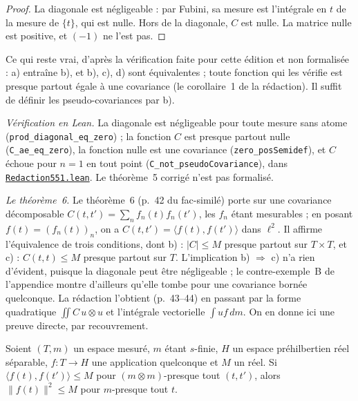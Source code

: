 \begin{proof}
La diagonale est négligeable : par Fubini, sa mesure est l'intégrale en $t$ de la mesure de $\{t\}$, qui est nulle. Hors de la diagonale, $C$ est nulle. La matrice nulle est positive, et $(-1)$ ne l'est pas.
\end{proof}

\noindent Ce qui reste vrai, d'après la vérification faite pour cette édition et non formalisée : a) entraîne b), et b), c), d) sont équivalentes ; toute fonction qui les vérifie est presque partout égale à une covariance (le corollaire~1 de la rédaction). Il suffit de définir les pseudo-covariances par b).

\begin{sloppypar}
\noindent\emph{Vérification en Lean.} La diagonale est négligeable pour toute mesure sans atome (\texttt{prod\_diagonal\_eq\_zero}) ; la fonction $C$ est presque partout nulle (\texttt{C\_ae\_eq\_zero}), la fonction nulle est une covariance (\texttt{zero\_posSemidef}), et $C$ échoue pour $n = 1$ en tout point (\texttt{C\_not\_pseudoCovariance}), dans \href{\leanblobmain/Redaction551.lean}{\texttt{Redaction551.\allowbreak{}lean}}. Le théorème~5 corrigé n'est pas formalisé.
\end{sloppypar}

\emph{Le théorème~6.} Le théorème~6 (p.~42 du fac-similé) porte sur une covariance décomposable $C(t, t') = \sum_n f_n(t) f_n(t')$, les $f_n$ étant mesurables ; en posant $f(t) = (f_n(t))_n$, on a $C(t, t') = \langle f(t), f(t') \rangle$ dans $\ell^2$. Il affirme l'équivalence de trois conditions, dont b) : $|C| \le M$ presque partout sur $T \times T$, et c) : $C(t, t) \le M$ presque partout sur $T$. L'implication b) $\Rightarrow$ c) n'a rien d'évident, puisque la diagonale peut être négligeable ; le contre-exemple~B de l'appendice montre d'ailleurs qu'elle tombe pour une covariance bornée quelconque. La rédaction l'obtient (p.~43--44) en passant par la forme quadratique $\iint C\,u \otimes u$ et l'intégrale vectorielle $\int u f\,dm$. On en donne ici une preuve directe, par recouvrement.

\begin{encadre}
\begin{enonce}
Soient $(T, m)$ un espace mesuré, $m$ étant $s$-finie, $H$ un espace préhilbertien réel séparable, $f : T \to H$ une application quelconque et $M$ un réel. Si $\langle f(t), f(t') \rangle \le M$ pour $(m \otimes m)$-presque tout $(t, t')$, alors $\|f(t)\|^2 \le M$ pour $m$-presque tout $t$.
\end{enonce}
\end{encadre}

